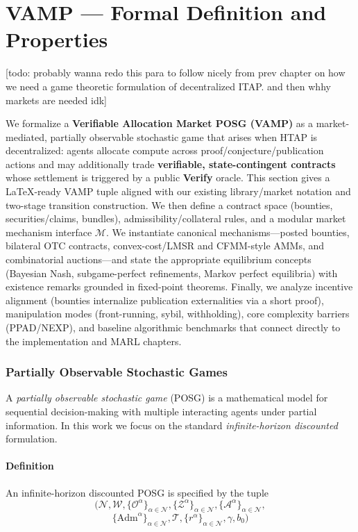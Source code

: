\chapter{VAMP --- Formal Definition and Properties}\label{chap:vamp}

[todo: probably wanna redo this para to follow nicely from prev chapter on how we need a game theoretic formulation of decentralized ITAP. and then whhy markets are needed idk]


\newcommand{\proves}{\vdash}
We formalize a \textbf{Verifiable Allocation Market POSG (VAMP)} as a market-mediated, partially observable stochastic game that arises when HTAP is decentralized: agents allocate compute across proof/conjecture/publication actions and may additionally trade \textbf{verifiable, state-contingent contracts} whose settlement is triggered by a public \textbf{Verify} oracle. This section gives a LaTeX-ready VAMP tuple aligned with our existing library/market notation and two-stage transition construction. We then define a contract space (bounties, securities/claims, bundles), admissibility/collateral rules, and a modular market mechanism interface \(\mathcal{M}\). We instantiate canonical mechanisms---posted bounties, bilateral OTC contracts, convex-cost/LMSR and CFMM-style AMMs, and combinatorial auctions---and state the appropriate equilibrium concepts (Bayesian Nash, subgame-perfect refinements, Markov perfect equilibria) with existence remarks grounded in fixed-point theorems. Finally, we analyze incentive alignment (bounties internalize publication externalities via a short proof), manipulation modes (front-running, sybil, withholding), core complexity barriers (PPAD/NEXP), and baseline algorithmic benchmarks that connect directly to the implementation and MARL chapters.


\subsection{Partially Observable Stochastic Games}


A \emph{partially observable stochastic game} (POSG) is a mathematical model for sequential decision-making with multiple interacting agents under partial information. In this work we focus on the standard \emph{infinite-horizon discounted} formulation.
\subsubsection{Definition}

An infinite-horizon discounted POSG is specified by the tuple
\[
\Big(\mathcal{N}, \mathcal{W},\{\mathcal{O}^\alpha\}_{\alpha\in \mathcal{N}},\{\mathcal{Z}^\alpha\}_{\alpha\in \mathcal{N}},
\{\mathcal{A}^\alpha\}_{\alpha\in \mathcal{N}},\]\[\{\mathrm{Adm}^\alpha\}_{\alpha\in\mathcal{N}},\mathcal{T},
\{r^\alpha\}_{\alpha\in \mathcal{N}},\gamma,b_0\Big)    
\]


